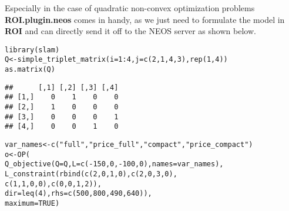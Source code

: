 \documentclass[a4paper]{article}\usepackage[]{graphicx}\usepackage[]{color}
\makeatletter
\newcommand{\hlnum}[1]{\textcolor[rgb]{0,0,0}{#1}}%
\newcommand{\hlstr}[1]{\textcolor[rgb]{0.741,0.553,0.545}{#1}}%
\newcommand{\hlopt}[1]{\textcolor[rgb]{0,0,0}{#1}}%
\newcommand{\hlstd}[1]{\textcolor[rgb]{0,0,0}{#1}}%
\newcommand{\hlkwb}[1]{\textcolor[rgb]{0.125,0.537,0.125}{#1}}%
\newcommand{\hlkwc}[1]{\textcolor[rgb]{0,0,1}{#1}}%
\newcommand{\hlkwd}[1]{\textcolor[rgb]{0,0,0}{#1}}%
\newenvironment{kframe}{%
 \def\at@end@of@kframe{}%
 \ifinner\ifhmode%
  \def\at@end@of@kframe{\end{minipage}}%
  \begin{minipage}{\columnwidth}%
 \fi\fi%
 \def\FrameCommand##1{\hskip\@totalleftmargin \hskip-\fboxsep
 \colorbox{shadecolor}{##1}\hskip-\fboxsep
     \hskip-\linewidth \hskip-\@totalleftmargin \hskip\columnwidth}%
 \MakeFramed {\advance\hsize-\width
   \@totalleftmargin\z@ \linewidth\hsize
   \@setminipage}}%
 {\par\unskip\endMakeFramed%
 \at@end@of@kframe}
\newenvironment{knitrout}{}{} %
\newcommand{\pkg}[1]{\textbf{#1}}
\makeatother
\begin{document}
Especially in the case of quadratic non-convex optimization problems
\pkg{ROI.plugin.neos} comes in handy, as we just need to formulate the model 
in \pkg{ROI} and can directly send it off to the NEOS server as shown below.
\begin{knitrout}
\color{fgcolor}\begin{kframe}
\begin{alltt}
\hlkwd{library}\hlstd{(slam)}
\hlstd{Q} \hlkwb{<-} \hlkwd{simple_triplet_matrix}\hlstd{(}\hlkwc{i} \hlstd{=} \hlnum{1}\hlopt{:}\hlnum{4}\hlstd{,} \hlkwc{j} \hlstd{=} \hlkwd{c}\hlstd{(}\hlnum{2}\hlstd{,} \hlnum{1}\hlstd{,} \hlnum{4}\hlstd{,} \hlnum{3}\hlstd{),} \hlkwd{rep}\hlstd{(}\hlnum{1}\hlstd{,} \hlnum{4}\hlstd{))}
\hlkwd{as.matrix}\hlstd{(Q)}
\end{alltt}
\begin{verbatim}
##      [,1] [,2] [,3] [,4]
## [1,]    0    1    0    0
## [2,]    1    0    0    0
## [3,]    0    0    0    1
## [4,]    0    0    1    0
\end{verbatim}
\begin{alltt}
\hlstd{var_names} \hlkwb{<-} \hlkwd{c}\hlstd{(}\hlstr{"full"}\hlstd{,} \hlstr{"price_full"}\hlstd{,} \hlstr{"compact"}\hlstd{,} \hlstr{"price_compact"}\hlstd{)}
\hlstd{o} \hlkwb{<-} \hlkwd{OP}\hlstd{(}
    \hlkwd{Q_objective}\hlstd{(}\hlkwc{Q} \hlstd{= Q,} \hlkwc{L} \hlstd{=} \hlkwd{c}\hlstd{(}\hlopt{-}\hlnum{150}\hlstd{,} \hlnum{0}\hlstd{,} \hlopt{-}\hlnum{100}\hlstd{,} \hlnum{0}\hlstd{),}  \hlkwc{names} \hlstd{= var_names),}
    \hlkwd{L_constraint}\hlstd{(}\hlkwd{rbind}\hlstd{(}\hlkwd{c}\hlstd{(}\hlnum{2}\hlstd{,} \hlnum{0}\hlstd{,} \hlnum{1}\hlstd{,} \hlnum{0}\hlstd{),} \hlkwd{c}\hlstd{(}\hlnum{2}\hlstd{,} \hlnum{0}\hlstd{,} \hlnum{3}\hlstd{,} \hlnum{0}\hlstd{),}
                       \hlkwd{c}\hlstd{(}\hlnum{1}\hlstd{,} \hlnum{1}\hlstd{,} \hlnum{0}\hlstd{,} \hlnum{0}\hlstd{),} \hlkwd{c}\hlstd{(}\hlnum{0}\hlstd{,} \hlnum{0}\hlstd{,} \hlnum{1}\hlstd{,} \hlnum{2}\hlstd{)),}
                 \hlkwc{dir} \hlstd{=} \hlkwd{leq}\hlstd{(}\hlnum{4}\hlstd{),} \hlkwc{rhs} \hlstd{=} \hlkwd{c}\hlstd{(}\hlnum{500}\hlstd{,} \hlnum{800}\hlstd{,} \hlnum{490}\hlstd{,} \hlnum{640}\hlstd{)),}
    \hlkwc{maximum} \hlstd{=} \hlnum{TRUE}\hlstd{)}
\end{alltt}
\end{kframe}
\end{knitrout}

\end{document}
